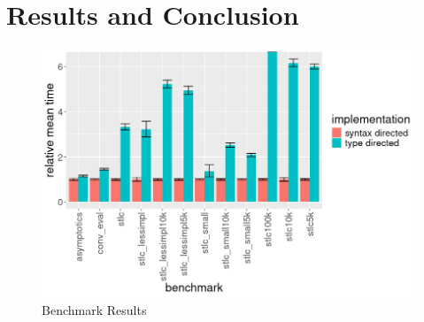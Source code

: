 \section{Results and Conclusion}

\begin{figure}[!htb]
  \includegraphics[totalheight=16em]{images/benchmark_graph.png}
  \caption{Benchmark Results}
  \label{fig:results}
\end{figure}

